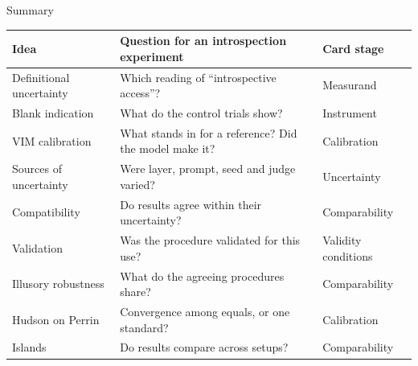 \documentclass[aspectratio=169,11pt]{beamer}
\begin{document}
\begin{frame}[label=summary]{Summary}
\begin{center}
{\footnotesize\renewcommand{\arraystretch}{1.0}
\begin{tabular}{L{3.6cm}L{6.4cm}L{2.6cm}}
\toprule
\textbf{Idea} & \textbf{Question for an introspection experiment} & \textbf{Card stage} \\
\midrule
Definitional uncertainty & Which reading of ``introspective access''? & Measurand \\
Blank indication & What do the control trials show? & Instrument \\
VIM calibration & What stands in for a reference? Did the model make it? & Calibration \\
Sources of uncertainty & Were layer, prompt, seed and judge varied? & Uncertainty \\
Compatibility & Do results agree within their uncertainty? & Comparability \\
Validation & Was the procedure validated for this use? & Validity conditions \\
Illusory robustness & What do the agreeing procedures share? & Comparability \\
Hudson on Perrin & Convergence among equals, or one standard? & Calibration \\
Islands & Do results compare across setups? & Comparability \\
\bottomrule
\end{tabular}
}
\end{center}
\end{frame}
\end{document}
